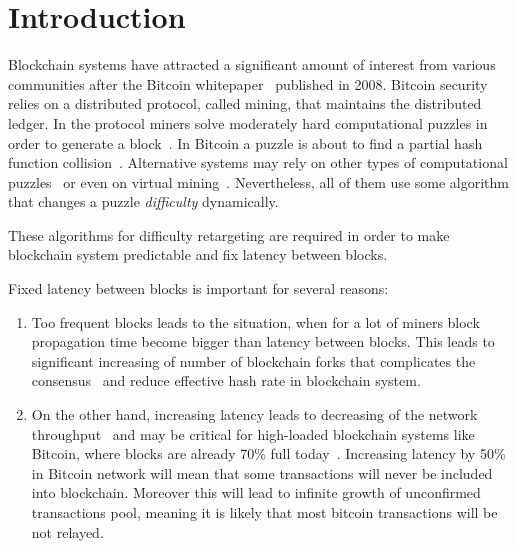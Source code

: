 \documentclass[number,preprint,review]{elsarticle}
\begin{document}
\section{Introduction}
\label{sec:intro}

Blockchain systems have attracted a significant amount of interest from various communities after the Bitcoin whitepaper~\cite{Nakamoto2008} published in 2008.
Bitcoin security relies on a distributed protocol, called mining, that maintains the distributed ledger. In the protocol miners solve moderately hard computational puzzles in order to generate a block~\cite{}. In Bitcoin a puzzle is about to find a partial hash function collision~\cite{}. Alternative systems may rely on other types of computational puzzles~\cite{??} or even on virtual mining~\cite{??}. Nevertheless, all of them use some algorithm that changes a puzzle \textit{difficulty} dynamically. 

These algorithms for difficulty retargeting are required in order to make blockchain system predictable and fix latency between blocks.

Fixed latency between blocks is important for several reasons:

\begin{enumerate}
\item{Too frequent blocks leads to the situation, when for a lot of miners block propagation time become bigger than latency between blocks. This leads to significant increasing of number of blockchain forks that complicates the consensus~\cite{decker2013information} and reduce effective hash rate in blockchain system.}

\item{On the other hand, increasing latency leads to decreasing of the network throughput~\cite{miller2016} and may be critical for high-loaded blockchain systems like Bitcoin, where blocks are already 70\% full today~\cite{armstrong2016}.
Increasing latency by 50\% in Bitcoin network will mean that some transactions will never be included into blockchain.
Moreover this will lead to infinite growth of unconfirmed transactions pool, meaning it is likely that most bitcoin transactions will be not relayed.}
\end{enumerate}
\end{document}
